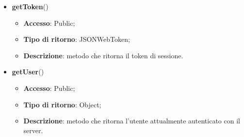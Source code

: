 {\begin{itemize}
\begin{itemize}
			\end{itemize}
			\item \textbf{getToken}()
			\begin{itemize}
				\item \textbf{Accesso}: Public;
				\item \textbf{Tipo di ritorno}: JSONWebToken;
				\item \textbf{Descrizione}: metodo che ritorna il token di sessione.
			\end{itemize}
			\item \textbf{getUser}()
			\begin{itemize}
				\item \textbf{Accesso}: Public;
				\item \textbf{Tipo di ritorno}: Object;
				\item \textbf{Descrizione}: metodo che ritorna l'utente attualmente autenticato con il server.
			\end{itemize}
		\end{itemize} 
}
